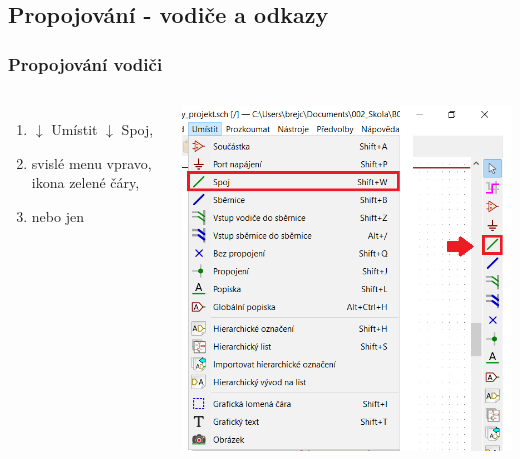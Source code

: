 \documentclass{beamer}
\begin{document}
\subsection{\texorpdfstring{Propojování - vodiče a odkazy}{Propojovani - vodice a odkazy}}
\begin{frame}
	\frametitle{Propojování vodiči}
	\begin{columns}
	
		\small
		\begin{enumerate}
			\item $\downarrow$ Umístit $\downarrow$ Spoj,
			\item svislé menu vpravo, ikona zelené čáry,
			\item {} nebo jen 
		\end{enumerate}
		
		\begin{center}
			\includegraphics[width=\textwidth]{obr/spoje01.png}
		\end{center}
		
	\end{columns}
\end{frame}
\end{document}
